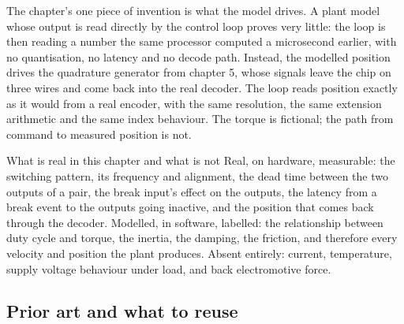 The chapter's one piece of invention is what the model drives. A plant model
whose output is read directly by the control loop proves very little: the loop
is then reading a number the same processor computed a microsecond earlier, with
no quantisation, no latency and no decode path. Instead, the modelled position
drives the quadrature generator from chapter 5, whose signals leave the chip on
three wires and come back into the real decoder. The loop reads position exactly
as it would from a real encoder, with the same resolution, the same extension
arithmetic and the same index behaviour. The torque is fictional; the path from
command to measured position is not.

\begin{note}{What is real in this chapter and what is not}
Real, on hardware, measurable: the switching pattern, its frequency and
alignment, the dead time between the two outputs of a pair, the break input's
effect on the outputs, the latency from a break event to the outputs going
inactive, and the position that comes back through the decoder.
Modelled, in software, labelled: the relationship between duty cycle and torque,
the inertia, the damping, the friction, and therefore every velocity and
position the plant produces. Absent entirely: current, temperature, supply
voltage behaviour under load, and back electromotive force.
\end{note}

\subsection*{Prior art and what to reuse}

